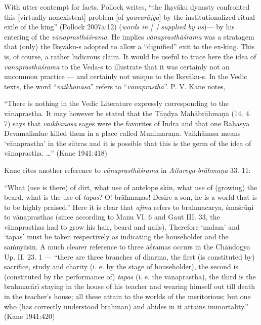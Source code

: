 With utter contempt for facts, Pollock writes, “the Ikṣvāku dynasty confronted this [virtually nonexistent] problem [of {\sl yauvarājya}] by the institutionalized ritual exile of the king” (Pollock 2007a:12) ({\sl words in [~] supplied by us})--- by his entering of the {\sl vānaprasthāśrama}. He implies {\sl vānaprasthāśrama} was a stratagem that (only) the  Ikṣvāku-s adopted to allow a “dignified” exit to the ex-king. This is, of course, a rather ludicrous claim. It would be useful to trace here the idea of {\sl vanaprasthāśrama} to the \hbox{Veda-s} to illustrate that it was certainly not an uncommon practice --- and certainly not unique to the Ikṣvāku-s. In the Vedic texts, the word “{\sl vaikhānasa}” refers to “{\sl vānaprastha}”. P. V. Kane notes, 

\begin{myquote}
{{“There is nothing in the Vedic Literature expressly corresponding to the vānaprastha. It may however be stated that the Tāṇḍya Mahābrāhmaṇa (14. 4. 7) says that {\sl vaikhānasa} sages were the favorites of Indra and that one Rahasya Devamalimluc killed them in a place called Munimaraṇa. Vaikhānasa means ‘vānaprastha’ in the sūtras and it is possible that this is the germ of the idea of vānaprastha. …”}}
\hfill  (Kane 1941:418)
\end{myquote}

Kane cites another reference to {\sl vānaprasthāśrama} in {\sl Aitareya-brāhmaṇa}
 33. 11:

\begin{myquote}
“What (use is there) of dirt, what use of antelope skin, what use of (growing) the beard, what is the use of {\sl tapas}? O! brāhmaṇas! Desire a son, he is a world that is to be highly praised.” Here it is clear that {\sl ajina} refers to brahmacarya, śmaśrūṇi to vānaprasthas (since according to Manu VI. 6 and Gaut III. 33, the vānaprasthas had to grow his hair, beard and nails). Therefore `malam’ and `tapas' must be taken respectively as indicating the householder and the saṁnyāsin. A much clearer reference to three āśramas occurs in the Chāndogya Up. II. 23. 1 --- “there are three branches of dharma, the first (is constituted by) sacrifice, study and charity (i. e. by the stage of householder), the second is (constituted by the performance of) {\sl tapas} (i. e. the vānaprastha), the third is the brahmacārī staying in the house of his teacher and wearing himself out till death in the teacher's house; all these attain to the worlds of the meritorious; but one who (has correctly understood brahman) and abides in it attains immortality.”
\hfill (Kane 1941:420)
\end{myquote}

